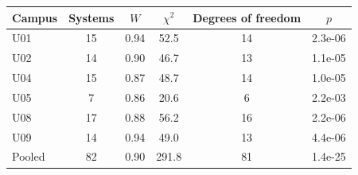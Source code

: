 \begin{tabular}{lccccc}
\toprule
Campus & Systems & $W$ & $\chi^2$ & Degrees of freedom & $p$ \\
\midrule
U01 & 15 & 0.94 & 52.5 & 14 & 2.3e-06 \\
U02 & 14 & 0.90 & 46.7 & 13 & 1.1e-05 \\
U04 & 15 & 0.87 & 48.7 & 14 & 1.0e-05 \\
U05 & 7 & 0.86 & 20.6 & 6 & 2.2e-03 \\
U08 & 17 & 0.88 & 56.2 & 16 & 2.2e-06 \\
U09 & 14 & 0.94 & 49.0 & 13 & 4.4e-06 \\
Pooled & 82 & 0.90 & 291.8 & 81 & 1.4e-25 \\
\bottomrule
\end{tabular}
